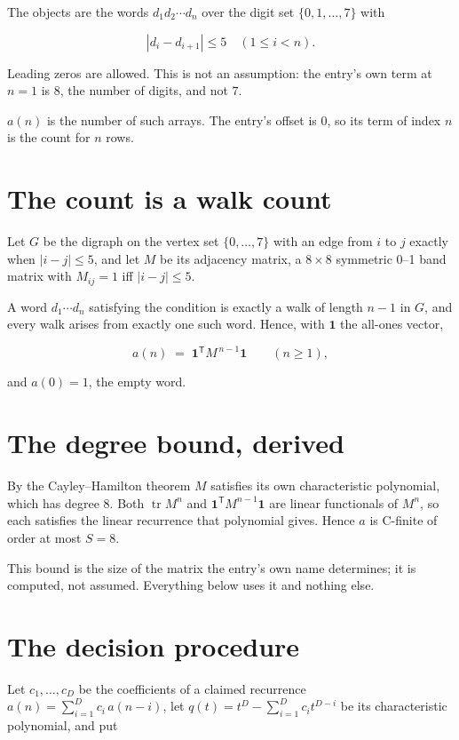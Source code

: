 \documentclass[11pt]{article}
\theoremstyle{definition}
\begin{document}
The objects are the words $d_1 d_2 \cdots d_n$ over the digit set $\{0,1,\dots,7\}$ with

\[|d_i - d_{i+1}| \le 5\quad (1 \le i < n).\]

Leading zeros are allowed. This is not an assumption: the entry's own term at $n=1$ is $8$, the number of digits, and not $7$.

$a(n)$ is the number of such arrays. The entry's offset is 0, so its term of index $n$ is the count for $n$ rows.

\section{The count is a walk count}

Let $G$ be the digraph on the vertex set $\{0,\dots,7\}$ with an edge from $i$ to $j$ exactly when $|i-j| \le 5$, and let $M$ be its adjacency matrix, a $8 \times 8$ symmetric 0--1 band matrix with $M_{ij} = 1$ iff $|i-j| \le 5$.

A word $d_1\cdots d_n$ satisfying the condition is exactly a walk of length $n-1$ in $G$, and every walk arises from exactly one such word. Hence, with $\mathbf 1$ the all-ones vector,

\[a(n) \;=\; \mathbf 1^{\mathsf T} M^{\,n-1} \mathbf 1 \qquad (n \ge 1),\]

and $a(0) = 1$, the empty word.

\section{The degree bound, derived}

By the Cayley--Hamilton theorem $M$ satisfies its own characteristic polynomial, which has degree $8$. Both $\operatorname{tr} M^n$ and $\mathbf 1^{\mathsf T} M^{n-1} \mathbf 1$ are linear functionals of $M^{n}$, so each satisfies the linear recurrence that polynomial gives. Hence $a$ is C-finite of order at most $S = 8$.

This bound is the size of the matrix the entry's own name determines; it is computed, not assumed. Everything below uses it and nothing else.

\section{The decision procedure}

Let $c_1,\dots,c_D$ be the coefficients of a claimed recurrence $a(n) = \sum_{i=1}^{D} c_i\,a(n-i)$, let $q(t) = t^{D} - \sum_{i=1}^{D} c_i t^{D-i}$ be its characteristic polynomial, and put
\end{document}
